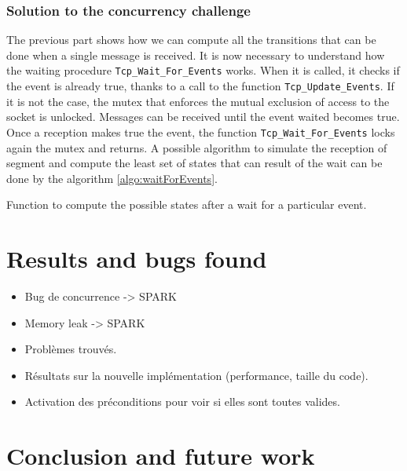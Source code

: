 \documentclass[runningheads]{llncs}
\begin{document}
\subsubsection{Solution to the concurrency challenge}

    The previous part shows how we can compute all the transitions that can be done when a single message is received.
    It is now necessary to understand how the waiting procedure \lstinline{Tcp_Wait_For_Events} works.
    When it is called, it checks if the event is already true, thanks to a call to the function \lstinline{Tcp_Update_Events}.
    If it is not the case, the mutex that enforces the mutual exclusion of access to the socket is unlocked.
    Messages can be received until the event waited becomes true.
    Once a reception makes true the event, the function \lstinline{Tcp_Wait_For_Events} locks again the mutex and returns.
    A possible algorithm to simulate the reception of segment and compute the least set of states that can result of the wait can be done
    by the algorithm \ref{algo:waitForEvents}.

    \begin{algorithm}
        \caption{Function to compute the possible states after a wait for a particular event.}
        \label{algo:waitForEvents}
    \end{algorithm}

\section{Results and bugs found}

    \begin{itemize}
        \item Bug de concurrence -> SPARK
        \item Memory leak -> SPARK
        \item Problèmes trouvés.
        \item Résultats sur la nouvelle implémentation (performance, taille du code).
        \item Activation des préconditions pour voir si elles sont toutes valides.
    \end{itemize}



\section{Conclusion and future work}




\end{document}
